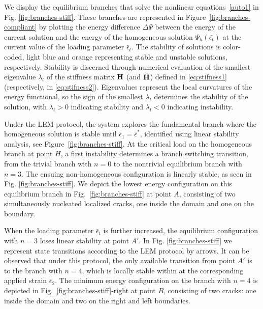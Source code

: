 We display the equilibrium branches that solve the nonlinear equations~\ref{auto1} in Fig. \ref{fig:branches-stiff}. These branches are represented in Figure~\ref{fig:branches-compliant} by plotting the energy difference $\Delta \Psi$ between the energy of the current solution and the energy of the homogeneous solution $\Psi_h(\bar{\epsilon_t})$ at the current value of the loading parameter $\bar\epsilon_t$. The stability of solutions is color-coded, light blue and orange representing stable and unstable solutions, respectively. Stability is discerned through numerical evaluation of the smallest eigenvalue $\lambda_t$ of the stiffness matrix $\mathbf{H}$ (and $\widetilde{\mathbf{H}}$) defined in \eqref{eq:stifness1} (respectively, in \eqref{eq:stifness2}). Eigenvalues represent the local curvatures of the energy functional, so the sign of the smallest  $\lambda_t$ determines the stability of the solution, with $\lambda_t > 0$ indicating stability and $\lambda_t < 0$ indicating instability.

Under the LEM protocol, the system explores the fundamental branch where the homogeneous solution is stable until  $\bar\epsilon_1=\bar\epsilon^*$, identified using linear stability analysis, see Figure~\ref{fig:branches-stiff}. At the critical load on the homogeneous branch  at point $H$, a first instability determines a branch switching transition, from the trivial branch with $n = 0$ to the nontrivial equilibrium branch with $n = 3$. The ensuing non-homogeneous configuration is linearly stable, as seen in Fig. \ref{fig:branches-stiff}. We depict the lowest energy configuration on this equilibrium branch in Fig.~\ref{fig:branches-stiff} at point $A$, consisting of two simultaneously nucleated localized cracks, one inside the domain and one on the boundary. 

When the loading parameter $\bar{\epsilon}_t$ is further increased, the equilibrium configuration with $n=3$ loses linear stability at point $A'$. In Fig. \ref{fig:branches-stiff} we represent state transitions according to the LEM protocol by arrows. It can be observed that under this protocol, the only available transition from point $A'$ is to the branch with $n=4$, which is locally stable within at the corresponding applied strain $\bar{\epsilon}_2$. The minimum energy configuration on the branch with $n=4$ is depicted in Fig.~\ref{fig:branches-stiff}-right at point $B$, consisting of two cracks: one inside the domain and two on the right and left boundaries.


